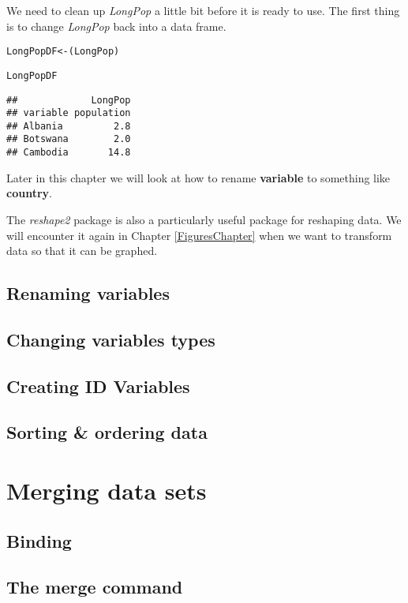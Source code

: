 \noindent We need to clean up \emph{LongPop} a little bit before it is ready to use. The first thing is to change \emph{LongPop} back into a data frame.

\begin{knitrout}
\color{fgcolor}\begin{kframe}
\begin{alltt}
LongPopDF <- (LongPop)

LongPopDF
\end{alltt}
\begin{verbatim}
##             LongPop
## variable population
## Albania         2.8
## Botswana        2.0
## Cambodia       14.8
\end{verbatim}
\end{kframe}
\end{knitrout}


Later in this chapter we will look at how to rename \textbf{variable} to something like \textbf{country}.

The \emph{reshape2} package \citep{R-reshape2} is also a particularly useful package for reshaping data. We will encounter it again in Chapter \ref{FiguresChapter} when we want to transform data so that it can be graphed.

\subsection{Renaming variables}

\subsection{Changing variables types}

\subsection{Creating ID Variables}

\subsection{Sorting \& ordering data}

\section{Merging data sets}

\subsection{Binding}

\subsection{The merge command}
